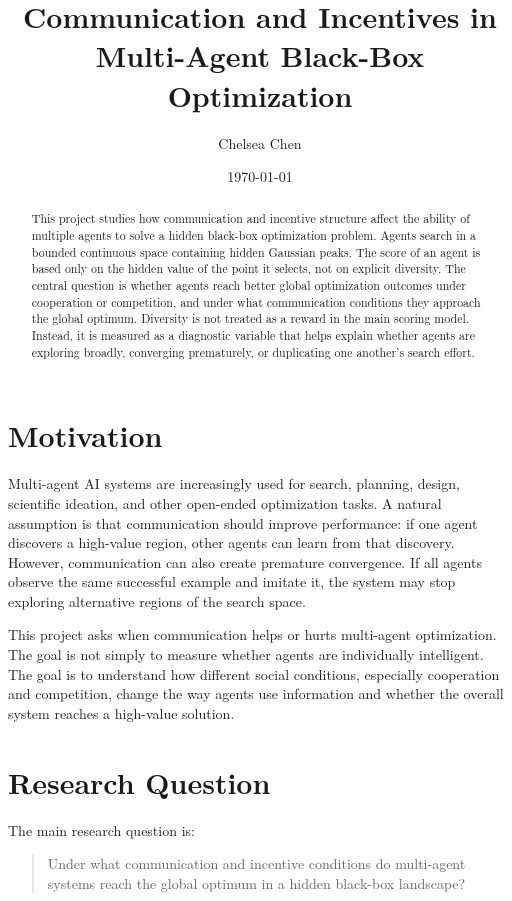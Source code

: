 \documentclass[11pt]{article}
\title{\textbf{Communication and Incentives in Multi-Agent Black-Box Optimization}}
\author{Chelsea Chen}
\date{\today}
\begin{document}
\maketitle

\begin{abstract}
This project studies how communication and incentive structure affect the ability of multiple agents to solve a hidden black-box optimization problem. Agents search in a bounded continuous space containing hidden Gaussian peaks. The score of an agent is based only on the hidden value of the point it selects, not on explicit diversity. The central question is whether agents reach better global optimization outcomes under cooperation or competition, and under what communication conditions they approach the global optimum. Diversity is not treated as a reward in the main scoring model. Instead, it is measured as a diagnostic variable that helps explain whether agents are exploring broadly, converging prematurely, or duplicating one another's search effort.
\end{abstract}

\section{Motivation}

Multi-agent AI systems are increasingly used for search, planning, design, scientific ideation, and other open-ended optimization tasks. A natural assumption is that communication should improve performance: if one agent discovers a high-value region, other agents can learn from that discovery. However, communication can also create premature convergence. If all agents observe the same successful example and imitate it, the system may stop exploring alternative regions of the search space.

This project asks when communication helps or hurts multi-agent optimization. The goal is not simply to measure whether agents are individually intelligent. The goal is to understand how different social conditions, especially cooperation and competition, change the way agents use information and whether the overall system reaches a high-value solution.

\section{Research Question}

The main research question is:

\begin{quote}
Under what communication and incentive conditions do multi-agent systems reach the global optimum in a hidden black-box landscape?
\end{quote}
\end{document}
